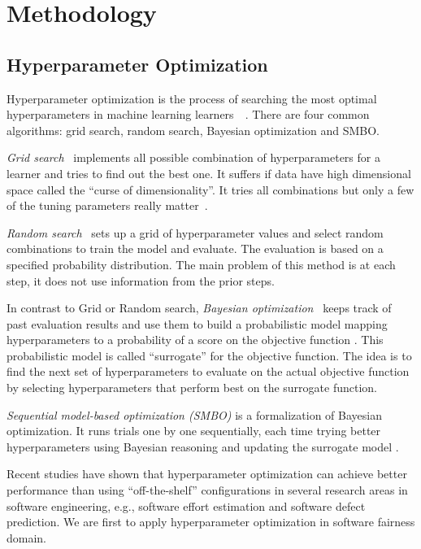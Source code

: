 \documentclass[10pt,conference,review]{IEEEtran}
\begin{document}
\section{Methodology}

\subsection{Hyperparameter Optimization}
 Hyperparameter optimization is the process of searching the most optimal hyperparameters in machine learning learners~\cite{biedenkapp2018hyperparameter}~\cite{franceschi2017forward}. There are four common algorithms: grid search, random search, Bayesian optimization and SMBO.

\textit{Grid search}~\cite{bergstra2011algorithms} implements all possible combination of hyperparameters for a learner and tries to find out the best one. It suffers if data have high dimensional space called the ``curse of dimensionality''. It tries all combinations but only a few of the tuning parameters really matter~\cite{bergstra2012random}.

\textit{Random search}~\cite{bergstra2012random} sets up a grid of hyperparameter values and select random combinations to train the model and evaluate. The evaluation is based on a specified probability distribution. The main problem of this method is at each step, it does not use information from the prior steps. 

In contrast to Grid or Random search, \textit{Bayesian optimization}~\cite{pelikan1999boa} keeps track of past evaluation results and use them to build a probabilistic model mapping hyperparameters to a probability of a score on the objective function \cite{Will_Koehrsen}. This probabilistic model is called ``surrogate'' for the objective function. The idea is to find the next set of hyperparameters to evaluate on the actual objective function by selecting hyperparameters that perform best on the surrogate function.

\textit{Sequential model-based optimization (SMBO)} \cite{10.1007/978-3-642-25566-3_40} is a formalization of Bayesian optimization. It runs trials one by one sequentially, each time trying better hyperparameters using Bayesian reasoning and updating the surrogate model \cite{Will_Koehrsen}.

Recent studies have shown that hyperparameter optimization can achieve better performance than using ``off-the-shelf'' configurations in several research areas in software engineering, e.g., software effort estimation\cite{xia2018hyperparameter} and software defect prediction\cite{osman2017hyperparameter}. We are first to apply hyperparameter optimization in software fairness domain.
\end{document}
